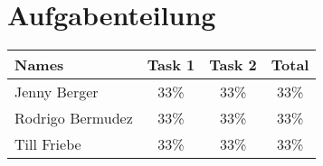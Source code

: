 \newpage
\section{Aufgabenteilung}
\begin{table}[htpb]
    \center
	\label{tab:Aufgabenteilung}
    \begin{tabular}{l|c|c|c}
        \large{Names}    & \large{Task 1} & \large{Task 2} & \large{Total} \\ \hline
        Jenny Berger     &           33\% &           33\% &          33\% \\
        Rodrigo Bermudez &           33\% &           33\% &          33\% \\
        Till Friebe      &           33\% &           33\% &          33\%
    \end{tabular}
\end{table}

